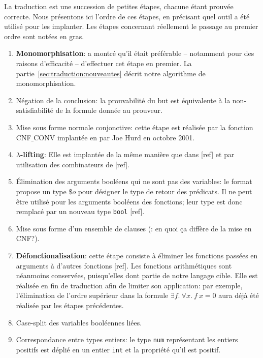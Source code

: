 La traduction est une succession de petites étapes, chacune étant
prouvée correcte. Nous présentons ici l'ordre de ces étapes, en
précisant quel outil a été utilisé pour les implanter. Les étapes
concernant réellement le passage au premier ordre sont notées en gras.
\begin{enumerate}
\item \textbf{Monomorphisation}: \cite{MengP08} a montré qu'il était
  préférable -- notamment pour des raisons d'efficacité -- d'effectuer
  cet étape en premier. La
  partie~\ref{sec:traduction:nouveautes} décrit notre
  algorithme de monomorphisation.
  \item Négation de la conclusion: la prouvabilité du but est
    équivalente à la non-satisfiabilité de la formule donnée au
    prouveur.
  \item Mise sous forme normale conjonctive: cette étape est réalisée
    par la fonction \textsf{CNF$\_$CONV} implantée en \holfour par Joe
    Hurd en octobre 2001.
  \item \textbf{$\lambda$-lifting}: Elle est
    implantée de la même manière que dans [\todo ref] et par utilisation
    des combinateurs de [\todo ref].
  \item Élimination des arguments booléens qui ne sont pas des
    variables: le format \tff propose un type $\$o$ pour désigner le
    type de retour des prédicats. Il ne peut être utilisé pour les
    arguments booléens des fonctions; leur type est donc remplacé par un
    nouveau type \verb!bool! [\todo ref].
  \item Mise sous forme d'un ensemble de clauses (\todo : en quoi ça
    diffère de la mise en CNF?).
  \item \textbf{Défonctionalisation}: cette étape consiste à éliminer
    les fonctions passées en arguments à d'autres fonctions [\todo ref].
    Les fonctions arithmétiques sont néanmoins conservées, puisqu'elles
    dont partie de notre langage cible. Elle est réalisée en fin de
    traduction afin de limiter son application: par exemple,
    l'élimination de l'ordre supérieur dans la formule $\exists f.\
    \forall x.\ f\ x = 0$ aura déjà été réalisée par les étapes
    précédentes.
  \item Case-split des variables booléennes liées.
  \item Correspondance entre types entiers: le type \holfour \verb!num!
    représentant les entiers positifs est déplié en un entier \verb!int!
    et la propriété qu'il est positif.
\end{enumerate}

